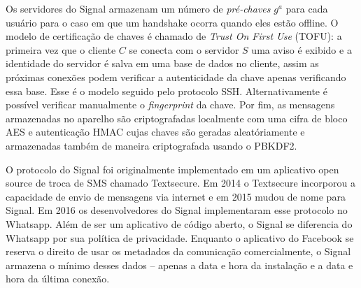 Os servidores do Signal armazenam um número de {\em pré-chaves} $g^a$ para cada usuário para o caso em que um handshake ocorra quando eles estão offline.
O modelo de certificação de chaves é chamado de {\em Trust On First Use} (TOFU): a primeira vez que o cliente $C$ se conecta com o servidor $S$ uma aviso é exibido e a identidade do servidor é salva em uma base de dados no cliente, assim as próximas conexões podem verificar a autenticidade da chave apenas verificando essa base.
Esse é o modelo seguido pelo protocolo SSH.
Alternativamente é possível verificar manualmente o {\em fingerprint} da chave.
Por fim, as mensagens armazenadas no aparelho são criptografadas localmente com uma cifra de bloco AES e autenticação HMAC cujas chaves são geradas aleatóriamente e armazenadas também de maneira criptografada usando o PBKDF2.

O protocolo do Signal foi originalmente implementado em um aplicativo open source de troca de SMS chamado Textsecure.
Em 2014 o Textsecure incorporou a capacidade de envio de mensagens via internet e em 2015 mudou de nome para Signal.
Em 2016 os desenvolvedores do Signal implementaram esse protocolo no Whatsapp.
Além de ser um aplicativo de código aberto, o Signal se diferencia do Whatsapp por sua política de privacidade.
Enquanto o aplicativo do Facebook se reserva o direito de usar os metadados da comunicação comercialmente, o Signal armazena o mínimo desses dados -- apenas a data e hora da instalação e a data e hora da última conexão.




